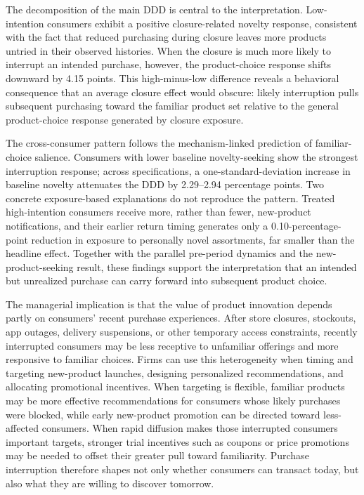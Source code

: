 \documentclass[11 pt]{article}
\begin{document}
The decomposition of the main DDD is central to the interpretation. Low-intention consumers exhibit a positive closure-related novelty response, consistent with the fact that reduced purchasing during closure leaves more products untried in their observed histories. When the closure is much more likely to interrupt an intended purchase, however, the product-choice response shifts downward by 4.15 points. This high-minus-low difference reveals a behavioral consequence that an average closure effect would obscure: likely interruption pulls subsequent purchasing toward the familiar product set relative to the general product-choice response generated by closure exposure.

The cross-consumer pattern follows the mechanism-linked prediction of familiar-choice salience. Consumers with lower baseline novelty-seeking show the strongest interruption response; across specifications, a one-standard-deviation increase in baseline novelty attenuates the DDD by 2.29--2.94 percentage points. Two concrete exposure-based explanations do not reproduce the pattern. Treated high-intention consumers receive more, rather than fewer, new-product notifications, and their earlier return timing generates only a 0.10-percentage-point reduction in exposure to personally novel assortments, far smaller than the headline effect. Together with the parallel pre-period dynamics and the new-product-seeking result, these findings support the interpretation that an intended but unrealized purchase can carry forward into subsequent product choice.

The managerial implication is that the value of product innovation depends partly on consumers' recent purchase experiences. After store closures, stockouts, app outages, delivery suspensions, or other temporary access constraints, recently interrupted consumers may be less receptive to unfamiliar offerings and more responsive to familiar choices. Firms can use this heterogeneity when timing and targeting new-product launches, designing personalized recommendations, and allocating promotional incentives. When targeting is flexible, familiar products may be more effective recommendations for consumers whose likely purchases were blocked, while early new-product promotion can be directed toward less-affected consumers. When rapid diffusion makes those interrupted consumers important targets, stronger trial incentives such as coupons or price promotions may be needed to offset their greater pull toward familiarity. Purchase interruption therefore shapes not only whether consumers can transact today, but also what they are willing to discover tomorrow.
\end{document}
